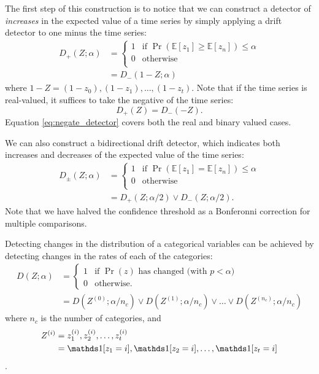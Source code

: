 The first step of this construction is to notice that we can construct a detector of {\it increases} in the expected value of a time series by simply applying a drift detector to one minus the time series:
\begin{align}
  D_+(Z;\alpha) &=
    \begin{cases} 
        1 & \text{if $\Pr(\mathbb{E}[z_1]\ge\mathbb{E}[z_n])\le \alpha$} \\
        0 & \text{otherwise} \\
    \end{cases}  \\
  &= D_-(1-Z;\alpha) \label{eq:negate_detector}
\end{align}
where $1-Z=(1-z_0),(1-z_1),\dots,(1-z_t)$. Note that if the time series is real-valued, it suffices to take the negative of the time series:
\begin{equation}
  D_+(Z) = D_-(-Z).
\end{equation}
Equation \ref{eq:negate_detector} covers both the real and binary valued cases.%

We can also construct a bidirectional drift detector, which indicates both increases and decreases of the expected value of the time series:
\begin{align}
  D_\pm(Z;\alpha) &=
    \begin{cases} 
        1 & \text{if $\Pr(\mathbb{E}[z_1]=\mathbb{E}[z_n])\le \alpha$} \\
        0 & \text{otherwise} \\
    \end{cases}  \\
  &= D_+(Z;\alpha/2) \vee D_-(Z;\alpha/2). \label{eq:bidir}
\end{align}
Note that we have halved the confidence threshold as a Bonferonni correction for multiple comparisons.

Detecting changes in the distribution of a categorical variables can be achieved by detecting changes in the rates of each of the categories:
\begin{align}
  D(Z;\alpha) &= \begin{cases}
  1 & \text{if $\Pr(z)$ has changed (with $p<\alpha$)} \\
  0 & \text{otherwise}.
  \end{cases} \\
  &= D(Z^{(0)};\alpha/n_c) \vee D(Z^{(1)};\alpha/n_c) \vee \dots \vee D(Z^{(n_c)};\alpha/n_c)
\end{align}
where $n_c$ is the number of categories, and 
\begin{align}
    Z^{(i)}&=z^{(i)}_1,z^{(i)}_2,\dots,z^{(i)}_t \\
    &=\id{z_1=i},\id{z_2=i},\dots,\id{z_t=i}
\end{align}.

